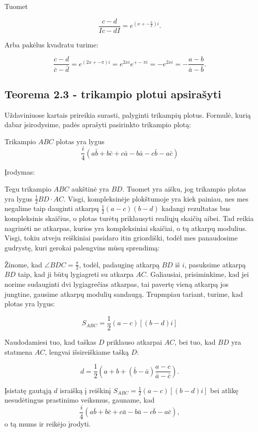 Tuomet 

$$ \frac{c-d}{I c - dI } = e^{(x +- \frac{\pi}{2})i}.$$ 

Arba pakėlus kvadratu turime:

$$ \frac{c-d}{\bar c - \bar d } = e^{(2x +-\pi)i}=e^{2xi} e^{+-\pi i}= - e^{2xi} = - \frac{a-b}{\bar a - \bar b}.$$ 


\subsection*{Teorema 2.3 - trikampio plotui apsirašyti}

Uždaviniuose kartais prireikia surasti, palyginti trikampių plotus.
Formulė, kurią dabar įsirodysime, padės aprašyti pasirinkto trikampio
plotą:

Trikampio $ABC$ plotas yra lygus 
$$ \frac{i}{4}(a\bar{b}+ b \bar{c} + c \bar{a} - b\bar{a} - c \bar{b} - a \bar{c})$$

Įrodymas:

Tegu trikampio $ABC$ aukštinė yra $BD$. Tuomet yra aišku, jog trikampio plotas yra lygus 
$ \frac {1}{2} BD \cdot AC $. Visgi, kompleksinėje plokštumoje yra kiek painiau, nes mes
negalime taip dauginti atkarpų $\frac {1}{2} (a-c)(b-d) $ kadangi rezultatas bus 
kompleksinis skaičius, o plotas turėtų priklausyti realiųjų skaičių aibei. Tad reikia
nagrinėti ne atkarpas, kurios yra kompleksiniai skaičiai, o tų atkarpų modulius. Visgi, 
tokiu atveju reiškiniai pasidaro itin griozdiški, todėl mes panaudosime gudrystę, kuri 
gerokai palengvins mūsų sprendimą:

Žinome, kad $\angle BDC = \frac {\pi}{2}$, todėl, padauginę atkarpą $BD$ iš $i$, pasuksime atkarpą $BD$ taip, kad ji būtų lygiagreti su atkarpa $AC$. Galiausiai, prisiminkime, kad jei norime sudauginti dvi lygiagrečias atkarpas, tai pavertę vieną atkarpą jos jungtine, gausime atkarpų modulių sandaugą. Trupmpiau tariant, turime, kad plotas yra lygus:

$$ S_{ABC} = \frac{1}{2}( a-c)[(b-d)i] $$

Naudodamiesi tuo, kad taškas $D$ priklauso atkarpai $AC$, bei tuo, kad $BD$ yra statmena $AC$, lengvai išsireiškiame tašką $D$:

$$ d =\frac {1}{2} ( a+b + (\bar{b}-\bar{a}) \frac{a-c}{ \bar{a}-\bar{c}}).$$

Įsistatę gautąją $d$ israišką į reiškinį $ S_{ABC} = \frac{1}{2}( a-c)[(b-d)i] $ bei atlikę 
nesudėtingus prastinimo veiksmus, gauname, kad
$$ \frac {i}{4}(a\bar{b}+ b \bar{c} + c \bar{a} - b\bar{a} - c \bar{b} - a \bar{c}), $$ 
o tą mums ir reikėjo įrodyti.  




